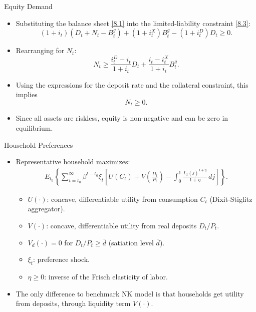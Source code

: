 \documentclass[11pt,aspectratio=169]{beamer}
\begin{document}
\begin{frame}{Equity Demand}
  \begin{itemize}
    \item Substituting the balance sheet \eqref{8.1} into the limited-liability constraint \eqref{8.3}:
    \[
      (1+i_t)(D_t + N_t - B_t^g)
      + (1+i_t^X)B_t^g
      - (1+i_t^D)D_t \ge 0.
    \]
    \item Rearranging for $N_t$:
    \[
      N_t \ge \frac{i_t^D - i_t}{1+i_t}D_t
             + \frac{i_t - i_t^X}{1+i_t}B_t^g.
    \]
    \item Using the expressions for the deposit rate and the collateral constraint, this implies
    \[
      N_t \ge 0.
    \]
    \item Since all assets are riskless, equity is non-negative and can be zero in equilibrium.
  \end{itemize}
\end{frame}


\begin{frame}{Household Preferences}
  \begin{itemize}
    \item Representative household maximizes:
    \begin{align}
        E_{t_0}\left\{
        \sum_{t=t_0}^\infty
          \beta^{t-t_0} \xi_t
          \left[
            U(C_t)
            + V\!\left(\frac{D_t}{P_t}\right)
            - \int_0^1 \frac{L_t(j)^{1+\eta}}{1+\eta} \, dj
          \right]
      \right\}. \label{8.7}
    \end{align}
    \begin{itemize}
      \item $U(\cdot)$: concave, differentiable utility from consumption $C_t$ (Dixit-Stiglitz aggregator).
      \item $V(\cdot)$: concave, differentiable utility from real deposits $D_t/P_t$.
      \item $V_d(\cdot)=0$ for $D_t/P_t \ge \bar{d}$ (satiation level $\bar{d}$).
      \item $\xi_t$: preference shock.
      \item $\eta \ge 0$: inverse of the Frisch elasticity of labor.
    \end{itemize}
    \item The only difference to benchmark NK model is that households get utility from deposits, through liquidity term $V(\cdot)$.
  \end{itemize}
\end{frame}
\end{document}
